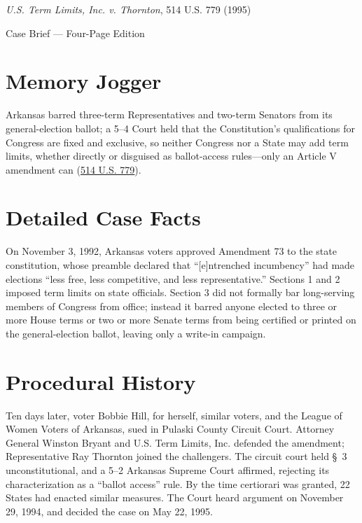\documentclass[12pt]{article}
\begin{document}
\begin{center}
{\LARGE \textit{U.S. Term Limits, Inc. v. Thornton}, 514 U.S. 779 (1995)\par}
\vspace{0.8em}
{\large Case Brief --- Four-Page Edition\par}
\end{center}
\vspace{1em}

\section{Memory Jogger}

Arkansas barred three-term Representatives and two-term Senators from its general-election ballot; a 5--4 Court held that the Constitution's qualifications for Congress are fixed and exclusive, so neither Congress nor a State may add term limits, whether directly or disguised as ballot-access rules---only an Article V amendment can (\href{https://supreme.justia.com/cases/federal/us/514/779/}{514 U.S. 779}).

\section{Detailed Case Facts}

On November 3, 1992, Arkansas voters approved Amendment 73 to the state constitution, whose preamble declared that ``[e]ntrenched incumbency'' had made elections ``less free, less competitive, and less representative.'' Sections 1 and 2 imposed term limits on state officials. Section 3 did not formally bar long-serving members of Congress from office; instead it barred anyone elected to three or more House terms or two or more Senate terms from being certified or printed on the general-election ballot, leaving only a write-in campaign.

\section{Procedural History}

Ten days later, voter Bobbie Hill, for herself, similar voters, and the League of Women Voters of Arkansas, sued in Pulaski County Circuit Court. Attorney General Winston Bryant and U.S. Term Limits, Inc. defended the amendment; Representative Ray Thornton joined the challengers. The circuit court held \S~3 unconstitutional, and a 5--2 Arkansas Supreme Court affirmed, rejecting its characterization as a ``ballot access'' rule. By the time certiorari was granted, 22 States had enacted similar measures. The Court heard argument on November 29, 1994, and decided the case on May 22, 1995.
\end{document}
